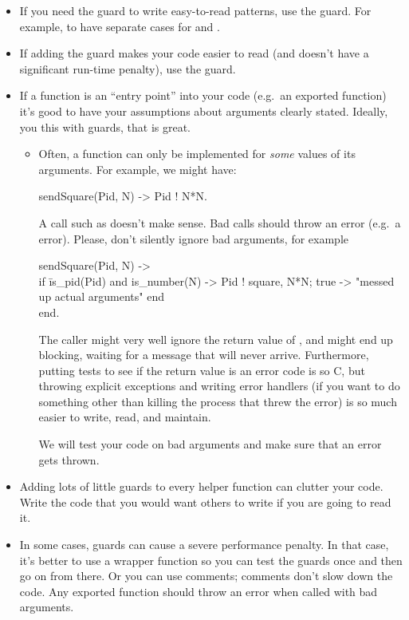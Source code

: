 \documentclass{article}
\begin{document}
\begin{itemize}
  \item If you need the guard to write easy-to-read patterns, use the guard.
    For example, to have separate cases for  and .
  \item If adding the guard makes your code easier to read (and doesn't have a
    significant run-time penalty), use the guard.
  \item If a function is an ``entry point'' into your code (e.g.\ an exported function)
    it's good to have your assumptions about arguments clearly stated.  Ideally, you
    this with guards, that is great.  
    \begin{itemize}
      \item Often, a function can only be implemented for \emph{some} values of its arguments.
	For example, we might have:
	\begin{SmallCode}
	  sendSquare(Pid, N) -> Pid ! N*N.
	\end{SmallCode}
	A call such as  doesn't make sense.
	Bad calls should throw an error (e.g.\ a  error).
	Please, don't silently ignore bad arguments, for example
	\begin{SmallCode}
	  sendSquare(Pid, N) ->\\
	  \> if \=is\_pid(Pid) and is\_number(N) -> Pid ! {square, N*N};
	  \>    \>true -> "messed up actual arguments"
	  \> end\\
	  end.
	\end{SmallCode}
	The caller might very well ignore the return value of , and
	 might end up blocking, waiting for a message that will never arrive.
	Furthermore, putting tests to see if the return value is an error code is so C,
	but throwing explicit exceptions and writing error handlers (if you want to do
	something other than killing the process that threw the error) is so much easier
	to write, read, and maintain.
	\par
	We will test your code on bad arguments and make sure that an error gets thrown.
    \end{itemize}
  \item Adding lots of little guards to every helper function can clutter your code.
    Write the code that you would want others to write if you are going to read it.
  \item In some cases, guards can cause a severe performance penalty.
    In that case, it's better to use a wrapper function so you can test the guards once
    and then go on from there. Or you can use comments; comments don't slow down the code.
    Any exported function should throw an error when called with bad arguments.
\end{itemize}
\end{document}
